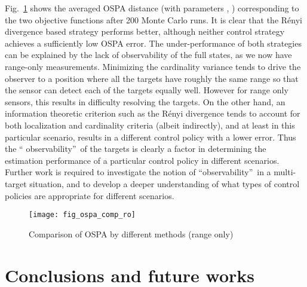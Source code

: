 \documentclass[twocolumn]{autart}
\begin{document}
Fig.~\ref{fig4} shows the averaged OSPA distance (with parameters , ) corresponding to the two objective functions after 200 Monte Carlo
runs. It is clear that the R\'{e}nyi divergence based strategy performs
better, although neither control strategy achieves a sufficiently low OSPA
error. The under-performance of both strategies can be explained by the lack
of observability of the full states, as we now have range-only measurements.
Minimizing the cardinality variance tends to drive the observer to a
position where all the targets have roughly the same range so that the
sensor can detect each of the targets equally well. However for range only
sensors, this results in difficulty resolving the targets. On the other
hand, an information theoretic criterion such as the R\'{e}nyi divergence tends to
account for both localization and cardinality criteria (albeit indirectly),
and at least in this particular scenario, results in a different control
policy with a lower error. Thus the \textquotedblleft
observability\textquotedblright\ of the targets is clearly a factor in
determining the estimation performance of a particular control policy in
different scenarios. Further work is required to investigate the notion of
\textquotedblleft observability\textquotedblright\ in a multi-target
situation, and to develop a deeper understanding of what types of control
policies are appropriate for different scenarios.
\begin{figure}[htb]
\centering
\texttt{[image: fig\_ospa\_comp\_ro]}
\caption{Comparison of OSPA by different methods (range
only) }
\label{fig4}
\end{figure}



\section{Conclusions and future works}
\end{document}

